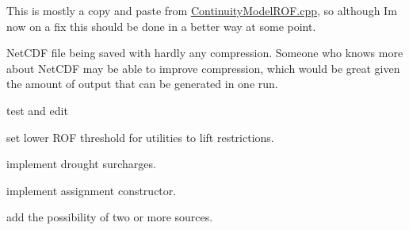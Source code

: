 
\begin{DoxyRefList}
\item[\label{todo__todo000002}%
\Hypertarget{todo__todo000002}%
Member \mbox{\hyperlink{classInsuranceStorageToROF_a4a50c4b15aba302fe1e928fb0cc66d32}{Insurance\+Storage\+To\+R\+OF\+:\+:calculate\+Short\+Term\+R\+O\+F\+Table}} (int week, const vector$<$ Utility $\ast$$>$ \&utilities, const int \&n\+\_\+utilities)]This is mostly a copy and paste from \mbox{\hyperlink{ContinuityModelROF_8cpp}{Continuity\+Model\+R\+O\+F.\+cpp}}, so although I\textquotesingle{}m now on a fix this should be done in a better way at some point.  
\item[\label{todo__todo000001}%
\Hypertarget{todo__todo000001}%
Member \mbox{\hyperlink{classMasterDataCollector_afabd59af08d3ee5dec1a6710a1966e8e}{Master\+Data\+Collector\+:\+:print\+N\+E\+T\+C\+D\+F\+Utilities}} (string file\+\_\+name)]Net\+C\+DF file being saved with hardly any compression. Someone who knows more about Net\+C\+DF may be able to improve compression, which would be great given the amount of output that can be generated in one run.  
\item[\label{todo__todo000005}%
\Hypertarget{todo__todo000005}%
Member \mbox{\hyperlink{classPaperTestProblem_a6db78df74d40f69a750b164caaca75c7}{Paper\+Test\+Problem\+:\+:function\+Evaluation}} (double $\ast$vars, double $\ast$objs, double $\ast$consts) override]test and edit  
\item[\label{todo__todo000003}%
\Hypertarget{todo__todo000003}%
Member \mbox{\hyperlink{classRestrictions_aec6f37bfaec7d6e22e82945289fd9acc}{Restrictions\+:\+:Restrictions}} (const int id, const vector$<$ double $>$ \&stage\+\_\+multipliers, const vector$<$ double $>$ \&stage\+\_\+triggers)]set lower R\+OF threshold for utilities to lift restrictions. 

implement drought surcharges.  
\item[\label{todo__todo000007}%
\Hypertarget{todo__todo000007}%
Member \mbox{\hyperlink{classSimulation_aa9ad48555e93d646d68c0df7a87e2356}{Simulation\+:\+:operator=}} (const \mbox{\hyperlink{classSimulation}{Simulation}} \&simulation)]implement assignment constructor.  
\item[\label{todo__todo000004}%
\Hypertarget{todo__todo000004}%
Member \mbox{\hyperlink{classTransfers_a40555bc28e085d0e119a9f039317c79f}{Transfers\+:\+:Transfers}} (const int id, const int source\+\_\+utility\+\_\+id, int transfer\+\_\+water\+\_\+source\+\_\+id, const double source\+\_\+treatment\+\_\+buffer, const vector$<$ int $>$ \&buyers\+\_\+ids, const vector$<$ double $>$ \&pipe\+\_\+transfer\+\_\+capacities, const vector$<$ double $>$ \&buyers\+\_\+transfer\+\_\+triggers, const \mbox{\hyperlink{classGraph}{Graph}} utilities\+\_\+graph, vector$<$ double $>$ conveyance\+\_\+costs, vector$<$ int $>$ pipe\+\_\+owner)]add the possibility of two or more sources. 


\end{DoxyRefList}

